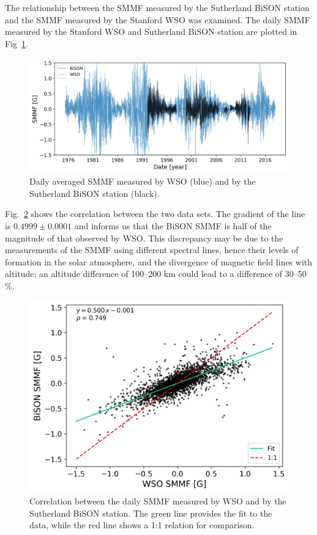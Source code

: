 The relationship between the SMMF measured by the Sutherland BiSON station and the SMMF measured by the Stanford WSO was examined. The daily SMMF measured by the Stanford WSO and Sutherland BiSON station are plotted in Fig~\ref{fig:BiSON_and_WSO}.

\begin{figure}[ht!]
    \centering
	\includegraphics[width=\columnwidth]{BiSON_and_WSO.png}
    \caption{Daily averaged SMMF measured by WSO (blue) and by the Sutherland BiSON station (black).}
    \label{fig:BiSON_and_WSO}
\end{figure}

Fig.~\ref{fig:BiSON_vs_WSO} shows the correlation between the two data sets. The gradient of the line is $0.4999\pm0.0001$ and informs us that the BiSON SMMF is half of the magnitude of that observed by WSO. This discrepancy may be due to the measurements of the SMMF using different spectral lines, hence their levels of formation in the solar atmosphere, and the divergence of magnetic field lines with altitude; an altitude difference of 100--200 km could lead to a difference of 30--50$\%$.

\begin{figure}[ht!]
    \centering
	\includegraphics[width=0.75\columnwidth]{BiSON_vs_WSO.png}
    \caption{Correlation between the daily SMMF measured by WSO and by the Sutherland BiSON station. The green line provides the fit to the data, while the red line shows a 1:1 relation for comparison.}
    \label{fig:BiSON_vs_WSO}
\end{figure}


